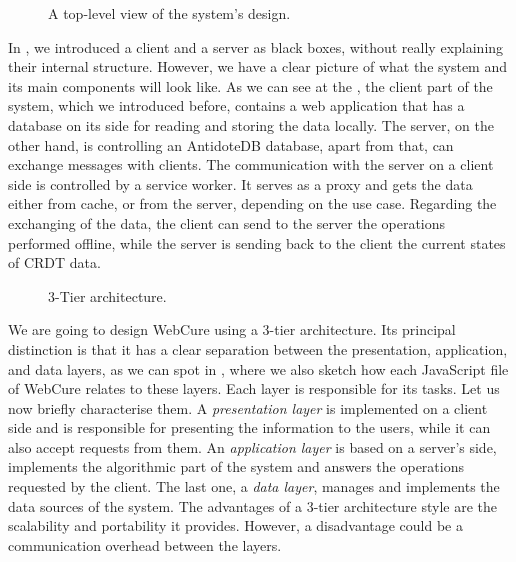 \begin{figure}[!htb]
    \begin{center}
        \setlength{\fboxsep}{15pt}%
        \setlength{\fboxrule}{1pt}%
    \def\svgwidth{\linewidth}
    \fbox{}
    \caption {A top-level view of the system's design.}
    \label{fig:impl1}
\end{center}
\end{figure}

In , we introduced a client and a server as black boxes, without really explaining their internal structure. However, we have a clear picture of what the system and its main components will look like. As we can see at the , the client part of the system, which we introduced before, contains a web application that has a database on its side for reading and storing the data locally. The server, on the other hand, is controlling an AntidoteDB database, apart from that, can exchange messages with clients. The communication with the server on a client side is controlled by a service worker. It serves as a proxy and gets the data either from cache, or from the server, depending on the use case. Regarding the exchanging of the data, the client can send to the server the operations performed offline, while the server is sending back to the client the current states of CRDT data. 

\begin{figure}[!htb]
    \begin{center}
    \def\svgwidth{\linewidth}
    
    \caption {3-Tier architecture.}
    \label{fig:dev1}
\end{center}
\end{figure}

We are going to design WebCure using a 3-tier architecture\cite{51}. Its principal distinction is that it has a clear separation between the presentation, application, and data layers, as we can spot in , where we also sketch how each JavaScript file of WebCure relates to these layers. Each layer is responsible for its tasks. Let us now briefly characterise them. A \textit{presentation layer} is implemented on a client side and is responsible for presenting the information to the users, while it can also accept requests from them. An \textit{application layer} is based on a server's side, implements the algorithmic part of the system and answers the operations requested by the client. The last one, a \textit{data layer}, manages and implements the data sources of the system. The advantages of a 3-tier architecture style are the scalability and portability it provides. However, a disadvantage could be a communication overhead between the layers\cite{50}.

